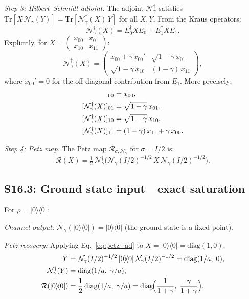 \documentclass[prl,twocolumn,superscriptaddress,longbibliography]{revtex4-2}
\newcommand{\Tr}{\mathrm{Tr}}
\newcommand{\Petz}{\mathcal{R}}
\newcommand{\chan}{\mathcal{N}}
\newcommand{\ket}[1]{|#1\rangle}
\newcommand{\bra}[1]{\langle#1|}
\begin{document}
\emph{Step 3: Hilbert--Schmidt adjoint.}
The adjoint $\chan_\gamma^\dagger$ satisfies
$\Tr[X\,\chan_\gamma(Y)] = \Tr[\chan_\gamma^\dagger(X)\,Y]$
for all $X,Y$. From the Kraus operators:
\begin{equation}
\chan_\gamma^\dagger(X) = E_0^\dagger X E_0 + E_1^\dagger X E_1.
\end{equation}
Explicitly, for $X = \begin{pmatrix} x_{00} & x_{01} \\
x_{10} & x_{11} \end{pmatrix}$:
\begin{equation}
\chan_\gamma^\dagger(X) = \begin{pmatrix}
x_{00} + \gamma\, x_{00}' & \sqrt{1-\gamma}\,x_{01} \\
\sqrt{1-\gamma}\,x_{10} & (1-\gamma)\,x_{11}
\end{pmatrix},
\end{equation}
where $x_{00}' = 0$ for the off-diagonal contribution from $E_1$.
More precisely:
\begin{align}
[\chan_\gamma^\dagger(X)]_{00} &= x_{00}, \notag\\
[\chan_\gamma^\dagger(X)]_{01} &= \sqrt{1-\gamma}\,x_{01}, \notag\\
[\chan_\gamma^\dagger(X)]_{10} &= \sqrt{1-\gamma}\,x_{10}, \notag\\
[\chan_\gamma^\dagger(X)]_{11} &= (1-\gamma)\,x_{11} + \gamma\,x_{00}.
\end{align}

\emph{Step 4: Petz map.}
The Petz map $\Petz_{\sigma,\chan_\gamma}$ for $\sigma = I/2$ is:
\begin{equation}
\Petz(X) = \tfrac{1}{2}\,\chan_\gamma^\dagger\!\big(
\chan_\gamma(I/2)^{-1/2}\, X\, \chan_\gamma(I/2)^{-1/2}\big).
\label{eq:petz_ad}
\end{equation}

\subsection{S16.3: Ground state input---exact saturation}

For $\rho = \ket{0}\!\bra{0}$:

\emph{Channel output:} $\chan_\gamma(\ket{0}\!\bra{0}) = \ket{0}\!\bra{0}$
(the ground state is a fixed point).

\emph{Petz recovery:} Applying Eq.~\eqref{eq:petz_ad} to
$X = \ket{0}\!\bra{0} = \mathrm{diag}(1,0)$:
\begin{align}
Y &= \chan_\gamma(I/2)^{-1/2}\,\ket{0}\!\bra{0}\,
     \chan_\gamma(I/2)^{-1/2}
   = \mathrm{diag}(1/a,\; 0), \notag\\
\chan_\gamma^\dagger(Y) &= \mathrm{diag}(1/a,\; \gamma/a), \notag\\
\Petz(\ket{0}\!\bra{0})
  &= \frac{1}{2}\,\mathrm{diag}(1/a,\; \gamma/a)
   = \mathrm{diag}\!\Big(\frac{1}{1+\gamma},\;
     \frac{\gamma}{1+\gamma}\Big).
\end{align}
\end{document}
